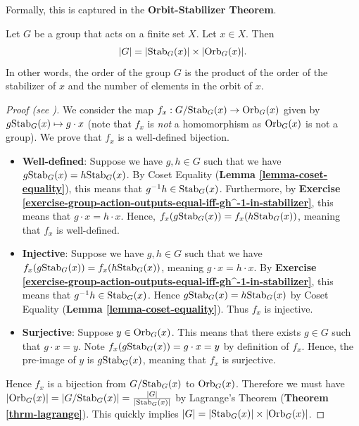 Formally, this is captured in the \textbf{Orbit-Stabilizer Theorem}.
\begin{theorem}\label{thrm-orbit-stabilizer}
    Let $G$ be a group that acts on a finite set $X$. Let $x \in X$. Then
    \[
        |G| = |\mathrm{Stab}_{G}(x)| \times |\mathrm{Orb}_{G}(x)|.
    \]
    In other words, the order of the group $G$ is the product of the order of the stabilizer of $x$ and the number of elements in the orbit of $x$.
\end{theorem}

\begin{proof}[Proof (see \cite{humphreys_1996})]
    We consider the map $f_x: G/\mathrm{Stab}_{G}(x) \to \mathrm{Orb}_{G}(x)$ given by $g\mathrm{Stab}_{G}(x) \mapsto g \cdot x$ (note that $f_x$ is \textit{not} a homomorphism as $\mathrm{Orb}_{G}(x)$ is not a group). We prove that $f_x$ is a well-defined bijection.
    \begin{itemize}
        \item \textbf{Well-defined}: Suppose we have $g, h \in G$ such that we have $g\mathrm{Stab}_{G}(x) = h\mathrm{Stab}_{G}(x)$. By Coset Equality (\textbf{Lemma \ref{lemma-coset-equality}}), this means that $g^{-1}h \in \mathrm{Stab}_{G}(x)$. Furthermore, by \textbf{Exercise \ref{exercise-group-action-outputs-equal-iff-gh^-1-in-stabilizer}}, this means that $g\cdot x = h\cdot x$. Hence, $f_x(g\mathrm{Stab}_{G}(x)) = f_x(h\mathrm{Stab}_{G}(x))$, meaning that $f_x$ is well-defined.
        \item \textbf{Injective}: Suppose we have $g, h \in G$ such that we have $f_x(g\mathrm{Stab}_{G}(x)) = f_x(h\mathrm{Stab}_{G}(x))$, meaning $g\cdot x = h\cdot x$. By \textbf{Exercise \ref{exercise-group-action-outputs-equal-iff-gh^-1-in-stabilizer}}, this means that $g^{-1}h \in \mathrm{Stab}_{G}(x)$. Hence $g\mathrm{Stab}_{G}(x) = h\mathrm{Stab}_{G}(x)$ by Coset Equality (\textbf{Lemma \ref{lemma-coset-equality}}). Thus $f_x$ is injective.
        \item \textbf{Surjective}: Suppose $y \in \mathrm{Orb}_{G}(x)$. This means that there exists $g \in G$ such that $g\cdot x = y$. Note $f_x(g\mathrm{Stab}_{G}(x)) = g\cdot x = y$ by definition of $f_x$. Hence, the pre-image of $y$ is $g\mathrm{Stab}_{G}(x)$, meaning that $f_x$ is surjective.
    \end{itemize}
    Hence $f_x$ is a bijection from $G/\mathrm{Stab}_{G}(x)$ to $\mathrm{Orb}_{G}(x)$. Therefore we must have $|\mathrm{Orb}_{G}(x)| = |G/\mathrm{Stab}_{G}(x)| = \frac{|G|}{|\mathrm{Stab}_{G}(x)|}$ by Lagrange's Theorem (\textbf{Theorem \ref{thrm-lagrange}}). This quickly implies $|G| = |\mathrm{Stab}_{G}(x)|\times|\mathrm{Orb}_{G}(x)|$.
\end{proof}

